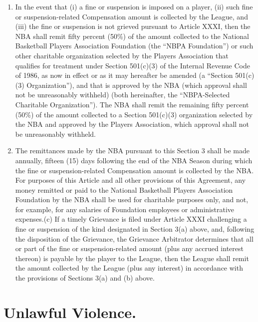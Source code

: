\documentclass[
]{book}
\providecommand{\tightlist}{%
  \setlength{\itemsep}{0pt}\setlength{\parskip}{0pt}}
\begin{document}
\begin{enumerate}
\def\labelenumi{(\alph{enumi})}
\tightlist
\item
  In the event that (i) a fine or suspension is imposed on a player, (ii) such fine or suspension-related Compensation amount is collected by the League, and (iii) the fine or suspension is not grieved pursuant to Article XXXI, then the NBA shall remit fifty percent (50\%) of the amount collected to the National Basketball Players Association Foundation (the ``NBPA Foundation'') or such other charitable organization selected by the Players Association that qualifies for treatment under Section 501(c)(3) of the Internal Revenue Code of 1986, as now in effect or as it may hereafter be amended (a ``Section 501(c)(3) Organization''), and that is approved by the NBA (which approval shall not be unreasonably withheld) (both hereinafter, the ``NBPA-Selected Charitable Organization''). The NBA shall remit the remaining fifty percent (50\%) of the amount collected to a Section 501(c)(3) organization selected by the NBA and approved by the Players Association, which approval shall not be unreasonably withheld.
\item
  The remittances made by the NBA pursuant to this Section 3 shall be made annually, fifteen (15) days following the end of the NBA Season during which the fine or suspension-related Compensation amount is collected by the NBA. For purposes of this Article and all other provisions of this Agreement, any money remitted or paid to the National Basketball Players Association Foundation by the NBA shall be used for charitable purposes only, and not, for example, for any salaries of Foundation employees or administrative expenses.(c) If a timely Grievance is filed under Article XXXI challenging a fine or suspension of the kind designated in Section 3(a) above, and, following the disposition of the Grievance, the Grievance Arbitrator determines that all or part of the fine or suspension-related amount (plus any accrued interest thereon) is payable by the player to the League, then the League shall remit the amount collected by the League (plus any interest) in accordance with the provisions of Sections 3(a) and (b) above.
\end{enumerate}

\hypertarget{unlawful-violence.}{%
\section{Unlawful Violence.}\label{unlawful-violence.}}
\end{document}
